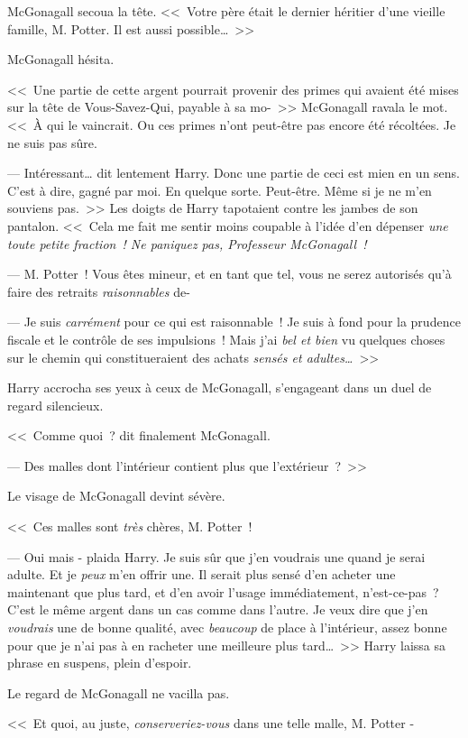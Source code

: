 McGonagall secoua la tête. <<~Votre père était le dernier héritier d'une vieille famille, M. Potter. Il est aussi possible…~>>

McGonagall hésita.

<<~Une partie de cette argent pourrait provenir des primes qui avaient été mises sur la tête de Vous-Savez-Qui, payable à sa mo-~>> McGonagall ravala le mot. <<~À qui le vaincrait. Ou ces primes n'ont peut-être pas encore été récoltées. Je ne suis pas sûre.

--- Intéressant… dit lentement Harry. Donc une partie de ceci est mien en un sens. C'est à dire, gagné par moi. En quelque sorte. Peut-être. Même si je ne m'en souviens pas.~>> Les doigts de Harry tapotaient contre les jambes de son pantalon. <<~Cela me fait me sentir moins coupable à l'idée d'en dépenser \emph{une toute petite fraction~! Ne paniquez pas, Professeur McGonagall~!}

--- M. Potter~! Vous êtes mineur, et en tant que tel, vous ne serez autorisés qu'à faire des retraits \emph{raisonnables} de-

--- Je suis \emph{carrément} pour ce qui est raisonnable~! Je suis à fond pour la prudence fiscale et le contrôle de ses impulsions~! Mais j'ai \emph{bel et bien} vu quelques choses sur le chemin qui constitueraient des achats \emph{sensés et adultes…}~>>

Harry accrocha ses yeux à ceux de McGonagall, s'engageant dans un duel de regard silencieux.

<<~Comme quoi~? dit finalement McGonagall.

--- Des malles dont l'intérieur contient plus que l'extérieur~?~>>

Le visage de McGonagall devint sévère.

<<~Ces malles sont \emph{très} chères, M. Potter~!

--- Oui mais - plaida Harry. Je suis sûr que j'en voudrais une quand je serai adulte. Et je \emph{peux} m'en offrir une. Il serait plus sensé d'en acheter une maintenant que plus tard, et d'en avoir l'usage immédiatement, n'est-ce-pas~? C'est le même argent dans un cas comme dans l'autre. Je veux dire que j'en \emph{voudrais} une de bonne qualité, avec \emph{beaucoup} de place à l'intérieur, assez bonne pour que je n'ai pas à en racheter une meilleure plus tard…~>> Harry laissa sa phrase en suspens, plein d'espoir.

Le regard de McGonagall ne vacilla pas.

<<~Et quoi, au juste, \emph{conserveriez-vous} dans une telle malle, M. Potter -

